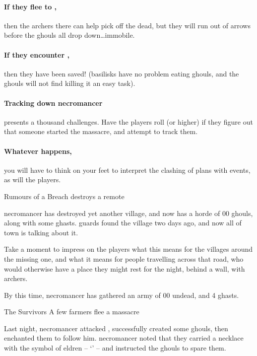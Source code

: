 \paragraph{If they flee to ,}
then the archers there can help pick off the dead, but they will run out of arrows before the ghouls all drop down\ldots immobile.

\paragraph{If they encounter ,}
then they have been saved!
(\glspl{basilisk} have no problem eating ghouls, and the ghouls will not find killing it an easy task).

\paragraph{Tracking down \gls{necromancer}}
presents a thousand challenges.
Have the players roll  (\tn[14] or higher) if they figure out that someone started the massacre, and attempt to track them.

\paragraph{Whatever happens,}
you will have to think on your feet to interpret the clashing of plans with events, as will the players.

{Rumours of a Breach}%
{ destroys a remote }%
\label{necroRumours}

\Gls{necromancer} has destroyed yet another \gls{village}, and now has a horde of 00 ghouls, along with some ghasts.
\Glspl{guard} found the \gls{village} two days ago, and now all of \gls{town} is talking about it.

Take a moment to impress on the players what this means for the \glspl{village} around the missing one, and what it means for people travelling across that road, who would otherwise have a place they might rest for the night, behind a wall, with archers.

By this time, \gls{necromancer} has gathered an army of 00 undead, and 4 ghasts.

{The Survivors}%
{A few farmers flee a massacre}%

\begin{exampletext}
  Last night, \gls{necromancer} attacked , successfully created some ghouls, then enchanted them to follow him.
  \Gls{necromancer} noted that they carried a necklace with the symbol of \gls{eldren} -- `' -- and instructed the ghouls to spare them.
\end{exampletext}

